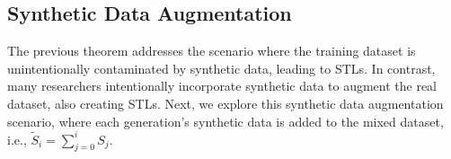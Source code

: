 \subsection{Synthetic Data Augmentation}\label{subsection_tra4}
The previous theorem addresses the scenario where the training dataset is unintentionally contaminated by synthetic data, leading to STLs. In contrast, many researchers intentionally incorporate synthetic data to augment the real dataset, also creating STLs. Next, we explore this synthetic data augmentation scenario, where each generation's synthetic data is added to the mixed dataset, i.e., $\widetilde{S}_i = \sum_{j=0}^i S_j$.

